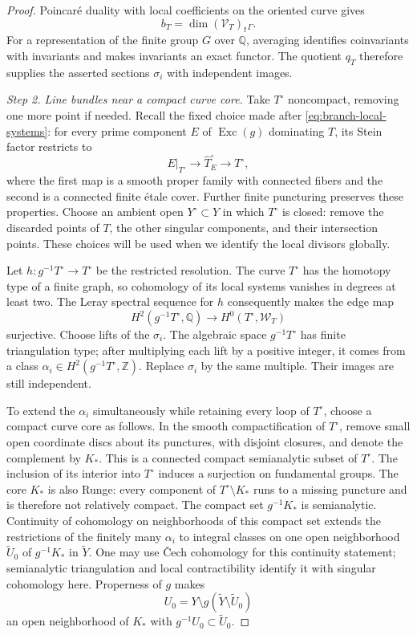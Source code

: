 \documentclass[11pt]{amsart}
\theoremstyle{definition}
\theoremstyle{remark}
\numberwithin{equation}{section}
\newcommand{\Q}{\mathbb{Q}}
\newcommand{\Z}{\mathbb{Z}}
\DeclareMathOperator{\Exc}{Exc}
\begin{document}
\begin{proof}
Poincar\'e duality with local coefficients on the oriented curve gives
\[
 b_T=\dim(\mathcal V_T)_t{}_{\Gamma}.
\]
For a representation of the finite group \(G\) over \(\Q\), averaging
identifies coinvariants with invariants and makes invariants an exact
functor.  The quotient \(q_T\) therefore supplies the asserted sections
\(\sigma_i\) with independent images.

\emph{Step 2. Line bundles near a compact curve core.}
Take \(T^\circ\) noncompact, removing one more point if needed.
Recall the fixed choice made after \eqref{eq:branch-local-systems}:
for every prime component \(E\) of \(\Exc(g)\) dominating \(T\),
its Stein factor restricts to
\begin{equation}\label{eq:global-divisor-family}
 E|_{T^\circ}\longrightarrow \widehat T_E^\circ\longrightarrow T^\circ,
\end{equation}
where the first map is a smooth proper family with connected fibers
and the second is a connected finite \'etale cover.  Further finite
puncturing preserves these properties.  Choose an ambient open
\(Y^\circ\subset Y\) in which \(T^\circ\) is closed: remove the
discarded points of \(T\), the other singular components, and their
intersection points.  These choices will be used when we identify the
local divisors globally.

Let \(h:g^{-1}T^\circ\to T^\circ\) be the restricted resolution.
The curve \(T^\circ\) has the homotopy type of a finite graph, so
cohomology of its local systems vanishes in degrees at least two.
The Leray spectral sequence for \(h\) consequently makes the edge map
\[
 H^2(g^{-1}T^\circ,\Q)
 \longrightarrow H^0(T^\circ,\mathcal W_T)
\]
surjective.  Choose lifts of the \(\sigma_i\).  The algebraic space
\(g^{-1}T^\circ\) has finite triangulation type; after multiplying
each lift by a positive integer, it comes from a class
\(\alpha_i\in H^2(g^{-1}T^\circ,\Z)\).  Replace \(\sigma_i\) by the
same multiple.  Their images are still independent.

To extend the \(\alpha_i\) simultaneously while retaining every loop
of \(T^\circ\), choose a compact curve core as follows.  In the smooth
compactification of \(T^\circ\), remove small open
coordinate discs about its punctures, with disjoint closures, and denote the complement by
\(K_*\).  This is a connected compact semianalytic subset of
\(T^\circ\).  The inclusion of its interior into \(T^\circ\) induces
a surjection on fundamental groups.  The core \(K_*\) is also Runge: every component of
\(T^\circ\setminus K_*\) runs to a missing puncture and is therefore
not relatively compact.  The compact set \(g^{-1}K_*\) is
semianalytic.  Continuity of cohomology on neighborhoods of this
compact set extends the restrictions of the finitely many
\(\alpha_i\) to integral classes on one open neighborhood
\(\widetilde U_0\) of \(g^{-1}K_*\) in \(\widetilde Y\).
One may use \v{C}ech cohomology for this continuity statement;
semianalytic triangulation and local contractibility identify it with
singular cohomology here.  Properness of \(g\) makes
\[
 U_0=Y\setminus g(\widetilde Y\setminus\widetilde U_0)
\]
an open neighborhood of \(K_*\) with \(g^{-1}U_0\subset\widetilde U_0\).


\end{proof}
\end{document}
